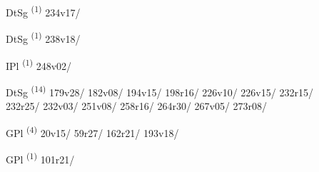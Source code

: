 \noindent{} \LEMMALINE
\begin{description}
    \item[] DtSg \textsuperscript{(1)} \mbox{234v17/}
\end{description}
\ENTRYEND

\noindent{} \LEMMALINE
\begin{description}
    \item[] DtSg \textsuperscript{(1)} \mbox{238v18/}
\end{description}
\ENTRYEND

\noindent{} \LEMMALINE
\begin{description}
    \item[] IPl \textsuperscript{(1)} \mbox{248v02/}
\end{description}
\ENTRYEND

\noindent{} \LEMMALINE
\begin{description}
    \item[] DtSg \textsuperscript{(14)} \mbox{179v28/} \mbox{182v08/} \mbox{194v15/} \mbox{198r16/} \mbox{226v10/} \mbox{226v15/} \mbox{232r15/} \mbox{232r25/} \mbox{232v03/} \mbox{251v08/} \mbox{258r16/} \mbox{264r30/} \mbox{267v05/} \mbox{273r08/}
\end{description}
\ENTRYEND

\noindent{} \LEMMALINE
\begin{description}
    \item[] GPl \textsuperscript{(4)} \mbox{20v15/} \mbox{59r27/} \mbox{162r21/} \mbox{193v18/}
\end{description}
\ENTRYEND

\noindent{} \LEMMALINE
\begin{description}
    \item[] GPl \textsuperscript{(1)} \mbox{101r21/}
\end{description}
\ENTRYEND

